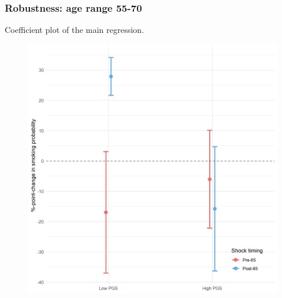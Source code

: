 \documentclass[10pt,compress,xcolor=dvipsnames,aspectratio=169]{beamer}    %
\newcounter{ex}
\newcommand{\1}[1]{\mathrm{1\hspace*{-2.5pt}l}[#1]}	%
\begin{document}
\begin{frame}
\frametitle{Robustness: age range 55-70}
Coefficient plot of the main regression.
\begin{figure}[hbtp]
\centering
\includegraphics[height=0.8\textheight]{../../3_output/shock_effects/robustness_5570_100_cvplot.png}
\label{fig:coeffplot55-70}
\end{figure}
\hyperlink{frame:robustness}{}
\end{frame}


%
\end{document}
